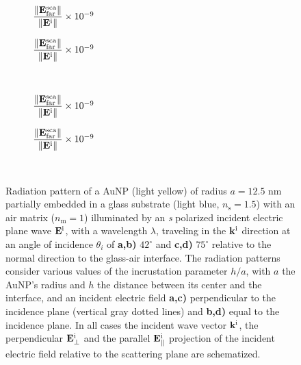 \begin{figure}[h!]
    \centering
    \def\svgwidth{.8\textwidth}
    \\[-16.7em]
    \hspace*{-.2\textwidth}%
        \begin{subfigure}{.4\textwidth}\caption{%
                    \footnotesize$\dfrac{\norm{\vb{E}^\text{sca}_\text{far}}}{\norm{\vb{E}^\text{i}}} \times 10^{-9}$  }\label{sfig:Far:Inc:s:a}\end{subfigure}%
        \begin{subfigure}{.4\textwidth}\caption{%
                    \footnotesize$\dfrac{\norm{\vb{E}^\text{sca}_\text{far}}}{\norm{\vb{E}^\text{i}}} \times 10^{-9}$  }\label{sfig:Far:Inc:s:b}\end{subfigure}\\[13em]
    \def\svgwidth{.8\textwidth}
    \hspace*{-.21\textwidth}%
    \vspace*{-.85em}%
        \begin{subfigure}{.4\textwidth}\caption{%
                    \footnotesize$\dfrac{\norm{\vb{E}^\text{sca}_\text{far}}}{\norm{\vb{E}^\text{i}}} \times 10^{-9}$  }\label{sfig:Far:Inc:s:c}\end{subfigure}%
        \begin{subfigure}{.4\textwidth}\caption{%
                    \footnotesize$\dfrac{\norm{\vb{E}^\text{sca}_\text{far}}}{\norm{\vb{E}^\text{i}}} \times 10^{-9}$  }\label{sfig:Far:Inc:s:d}\end{subfigure}\\
    \caption[  Radiation pattern of a AuNP supported on a substrate illuminated at oblique incidence ]{%
    Radiation pattern of a AuNP (light yellow) of radius $a = 12.5$ nm partially embedded in a glass substrate (light blue, $n_\text{s} = 1.5$) with an air matrix ($n_\text{m} = 1$) illuminated by an \textit{s} polarized incident electric plane wave $\vb{E}^\text{i}$, with a wavelength $\lambda$, traveling in the $\vb{k}^\text{i}$ direction at an angle of incidence $\theta_i$ of \textbf{a,b)} $42^\circ$ and \textbf{c,d)} $75^\circ$ relative to the normal direction to the glass-air interface. The radiation patterns consider various values of the incrustation parameter $h/a$, with $a$ the AuNP's radius and $h$ the distance between its center and the interface, and an  incident electric field \textbf{a,c)} perpendicular to the incidence plane (vertical gray dotted lines) and \textbf{b,d)} equal to the incidence plane. In all cases the incident wave vector $\vb{k}^\text{i}$, the perpendicular $\vb{E}_\perp^\text{i}$ and the  parallel $\vb{E}_\parallel^\text{i}$ projection of the incident electric field relative to the scattering plane are schematized.%
     }
    \label{fig:Far:Inc:s}
\end{figure}

